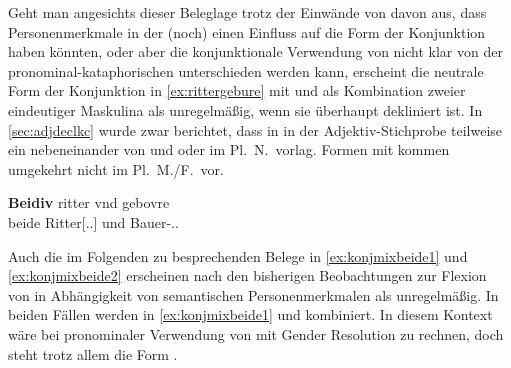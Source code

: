 Geht man angesichts dieser Beleglage trotz der Einwände von
\citet{gjelsten1980,ksw2} davon aus, dass Personenmerkmale in der
\citet{kc} (noch) einen Einfluss auf die Form der Konjunktion haben
könnten, oder aber die konjunktionale Verwendung von  nicht
klar von der pronominal-kataphorischen unterschieden werden kann, erscheint
die neutrale Form der Konjunktion in \cref{ex:rittergebure} mit 
 und   als Kombination zweier
eindeutiger Maskulina als unregelmäßig, wenn sie überhaupt dekliniert ist. In
\cref{sec:adjdeclkc} wurde zwar berichtet, dass in \citet{kc:VB} in der
Adjektiv-Stichprobe teilweise ein nebeneinander von  und 
oder  im Pl.~N.\ vorlag. Formen mit  kommen umgekehrt
nicht im Pl.~M./F.\ vor.

\begin{exe}
\ex\label{ex:rittergebure}
	\gll \textbf{Beidiv} ritter vnd gebovre \\
		beide Ritter[\Acc.\Pl.\MascM] und Bauer-\Acc.\Pl.\MascM{} \\
	\begin{taggedline}{\parencite[\pno~109\va, 29]{kc:VB}}
	\trans {}
	\end{taggedline}
\end{exe}

Auch die im Folgenden zu besprechenden Belege in \cref{ex:konjmixbeide1} und
\cref{ex:konjmixbeide2} erscheinen nach den bisherigen Beobachtungen zur
Flexion von  in Abhängigkeit von semantischen Personenmerkmalen
als unregelmäßig. In beiden Fällen werden in \cref{ex:konjmixbeide1}
 und  kombiniert. In diesem Kontext wäre bei pronominaler
Verwendung von  mit Gender Resolution zu rechnen, doch steht
trotz allem die Form .

